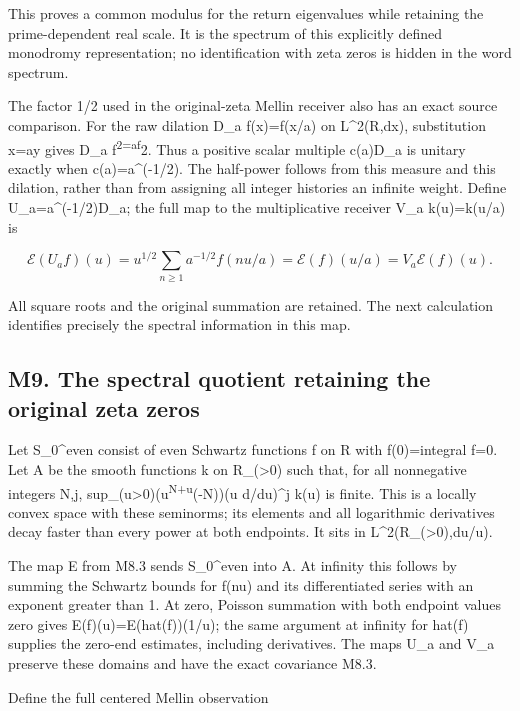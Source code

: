 \documentclass[
]{article}
\begin{document}
This proves a common modulus for the return eigenvalues while retaining
the prime-dependent real scale. It is the spectrum of this explicitly
defined monodromy representation; no identification with zeta zeros is
hidden in the word spectrum.

The factor 1/2 used in the original-zeta Mellin receiver also has an
exact source comparison. For the raw dilation D\_a f(x)=f(x/a) on
L\^{}2(R,dx), substitution x=ay gives \textbar\textbar D\_a
f\textbar\textbar{}\textsuperscript{2=a\textbar\textbar f\textbar\textbar{}}2.
Thus a positive scalar multiple c(a)D\_a is unitary exactly when
c(a)=a\^{}(-1/2). The half-power follows from this measure and this
dilation, rather than from assigning all integer histories an infinite
weight. Define U\_a=a\^{}(-1/2)D\_a; the full map to the multiplicative
receiver V\_a k(u)=k(u/a) is

\[
\mathcal E(U_a f)(u)
=u^{1/2}\sum_{n\ge1}a^{-1/2}f(nu/a)
=\mathcal E(f)(u/a)=V_a\mathcal E(f)(u).
\tag{M8.3}
\]

All square roots and the original summation are retained. The next
calculation identifies precisely the spectral information in this map.

\subsection{M9. The spectral quotient retaining the original zeta
zeros}\label{m9.-the-spectral-quotient-retaining-the-original-zeta-zeros}

Let S\_0\^{}even consist of even Schwartz functions f on R with
f(0)=integral f=0. Let A be the smooth functions k on R\_(\textgreater0)
such that, for all nonnegative integers N,j,
sup\_(u\textgreater0)(u\textsuperscript{N+u}(-N))\textbar(u d/du)\^{}j
k(u)\textbar{} is finite. This is a locally convex space with these
seminorms; its elements and all logarithmic derivatives decay faster
than every power at both endpoints. It sits in
L\^{}2(R\_(\textgreater0),du/u).

The map E from M8.3 sends S\_0\^{}even into A. At infinity this follows
by summing the Schwartz bounds for f(nu) and its differentiated series
with an exponent greater than 1. At zero, Poisson summation with both
endpoint values zero gives E(f)(u)=E(hat(f))(1/u); the same argument at
infinity for hat(f) supplies the zero-end estimates, including
derivatives. The maps U\_a and V\_a preserve these domains and have the
exact covariance M8.3.

Define the full centered Mellin observation
\end{document}
